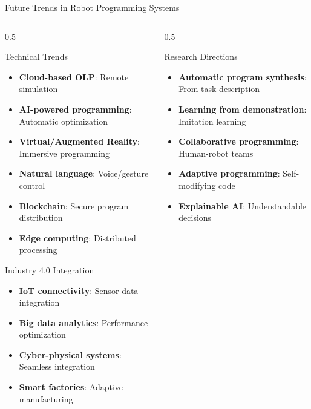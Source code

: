 \documentclass[10pt,aspectratio=169]{beamer}
\begin{document}
\begin{frame}{Future Trends in Robot Programming Systems}
\begin{columns}[T]
\begin{column}{0.5\textwidth}
\begin{block}{Technical Trends}
\begin{itemize}
\item \textbf{Cloud-based OLP}: Remote simulation
\item \textbf{AI-powered programming}: Automatic optimization
\item \textbf{Virtual/Augmented Reality}: Immersive programming
\item \textbf{Natural language}: Voice/gesture control
\item \textbf{Blockchain}: Secure program distribution
\item \textbf{Edge computing}: Distributed processing
\end{itemize}
\end{block}
\begin{alertblock}{Industry 4.0 Integration}
\begin{itemize}
\item \textbf{IoT connectivity}: Sensor data integration
\item \textbf{Big data analytics}: Performance optimization
\item \textbf{Cyber-physical systems}: Seamless integration
\item \textbf{Smart factories}: Adaptive manufacturing
\end{itemize}
\end{alertblock}
\end{column}
\begin{column}{0.5\textwidth}
\begin{block}{Research Directions}
\begin{itemize}
\item \textbf{Automatic program synthesis}: From task description
\item \textbf{Learning from demonstration}: Imitation learning
\item \textbf{Collaborative programming}: Human-robot teams
\item \textbf{Adaptive programming}: Self-modifying code
\item \textbf{Explainable AI}: Understandable decisions
\end{itemize}
\end{block}
\begin{center}
\end{center}
\end{column}
\end{columns}
\end{frame}
\end{document}
